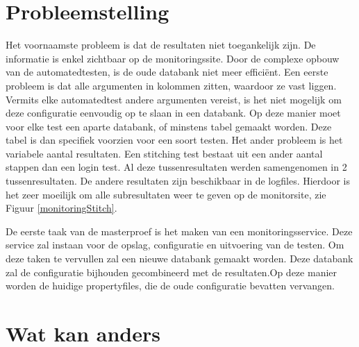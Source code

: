 \clearpage
\section{Probleemstelling}
\npar
Het voornaamste probleem is dat de resultaten niet toegankelijk zijn. De informatie is enkel zichtbaar op de monitoringssite. 
\npar
Door de complexe opbouw van de automatedtesten, is de oude databank niet meer efficiënt. Een eerste probleem is dat alle argumenten in kolommen zitten, waardoor ze vast liggen. Vermits elke automatedtest andere argumenten vereist, is het niet mogelijk om deze configuratie eenvoudig op te slaan in een databank. Op deze manier moet voor elke test een aparte databank, of minstens tabel gemaakt worden. Deze tabel is dan specifiek voorzien voor een soort testen.
\npar
Het ander probleem is het variabele aantal resultaten. Een stitching test bestaat uit een ander aantal stappen dan een login test. Al deze tussenresultaten werden samengenomen in 2 tussenresultaten. De andere resultaten zijn beschikbaar in de logfiles.  Hierdoor is het zeer moeilijk om alle subresultaten weer te geven op de monitorsite, zie Figuur \ref{monitoringStitch}.
\npar

\npar
De eerste taak van de masterproef is het maken van een monitoringsservice. Deze service zal instaan voor de opslag, configuratie en uitvoering van de testen. Om deze taken te vervullen zal een nieuwe databank gemaakt worden. Deze databank zal de configuratie bijhouden gecombineerd met de resultaten.Op deze manier worden de huidige propertyfiles, die de oude configuratie bevatten vervangen. 


\clearpage
\section{Wat kan anders}
